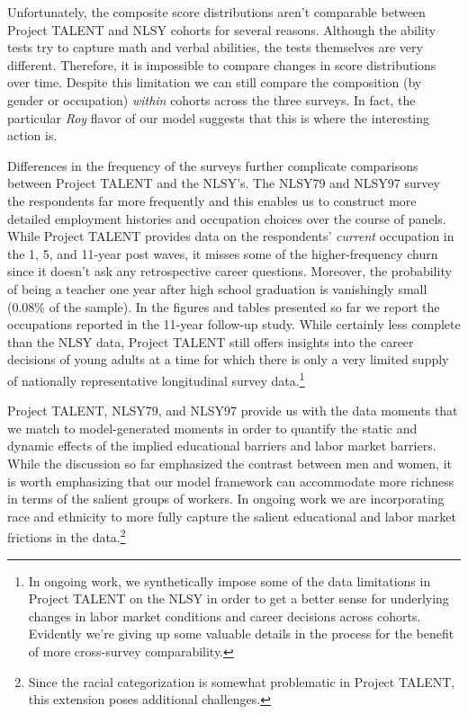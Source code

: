 \documentclass[onehalfspacing,11pt]{article}
\begin{document}
Unfortunately, the composite score distributions aren't comparable between Project TALENT and NLSY cohorts for several reasons. Although the ability tests try to capture math and verbal abilities, the tests themselves are very different. Therefore, it is impossible to compare changes in score distributions over time. Despite this limitation we can still compare the composition (by gender or occupation) {\it within} cohorts across the three surveys. In fact, the particular {\it Roy} flavor of our model suggests that this is where the interesting action is.

Differences in the frequency of the surveys further complicate comparisons between Project TALENT and the NLSY's. The NLSY79 and NLSY97 survey the respondents far more frequently and this enables us to construct more detailed employment histories and occupation choices over the course of panels. While Project TALENT provides data on the respondents' {\it current} occupation in the 1, 5, and 11-year post waves, it misses some of the higher-frequency churn since it doesn't ask any retrospective career questions. Moreover, the probability of being a teacher one year after high school graduation is vanishingly small (0.08\% of the sample). In the figures and tables presented so far we report the occupations reported in the 11-year follow-up study. While certainly less complete than the NLSY data, Project TALENT still offers insights into the career decisions of young adults at a time for which there is only a very limited supply of nationally representative longitudinal survey data.\footnote{In ongoing work, we synthetically impose some of the data limitations in Project TALENT on the NLSY in order to get a better sense for underlying changes in labor market conditions and career decisions across cohorts. Evidently we're giving up some valuable details in the process for the benefit of more cross-survey comparability.}

Project TALENT, NLSY79, and NLSY97 provide us with the data moments that we match to model-generated moments in order to quantify the static and dynamic effects of the implied educational barriers and labor market barriers. While the discussion so far emphasized the contrast between men and women, it is worth emphasizing that our model framework can accommodate more richness in terms of the salient groups of workers. In ongoing work we are incorporating race and ethnicity to more fully capture the salient educational and labor market frictions in the data.\footnote{Since the racial categorization is somewhat problematic in Project TALENT, this extension poses additional challenges.}
\end{document}

